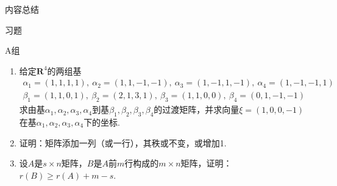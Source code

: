 \vspace{2ex}
\centerline{\heiti \Large 内容总结}

\vspace{2ex}
\centerline{\heiti \Large 习题}

\vspace{2ex}
{\kaishu }
\begin{flushright}
    \kaishu

\end{flushright}

\centerline{\heiti A组}
\begin{enumerate}
    \item 给定$\mathbf{R}^4$的两组基
          \begin{gather*}
              \alpha_1=(1,1,1,1),\ \alpha_2=(1,1,-1,-1),\ \alpha_3=(1,-1,1,-1),\ \alpha_4=(1,-1,-1,1) \\
              \beta_1=(1,1,0,1),\ \beta_2=(2,1,3,1),\ \beta_3=(1,1,0,0),\ \beta_4=(0,1,-1,-1)
          \end{gather*}
          求由基$\alpha_1,\alpha_2,\alpha_3,\alpha_4$到基$\beta_1,\beta_2,\beta_3,\beta_4$的过渡矩阵，并求向量$\xi=(1,0,0,-1)$在基$\alpha_1,\alpha_2,\alpha_3,\alpha_4$下的坐标.

    \item 证明：矩阵添加一列（或一行），其秩或不变，或增加1.

    \item 设$A$是$s \times n$矩阵，$B$是$A$前$m$行构成的$m \times n$矩阵，证明：$r(B) \geqslant r(A) + m - s$.
\end{enumerate}

